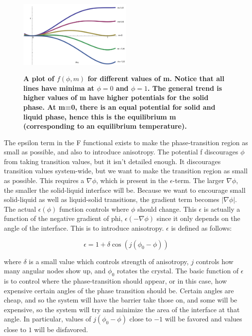 \documentclass[10pt]{article} %
\begin{document}
\begin{figure}[h!]
  \caption{\textbf{A plot of $f(\phi,m)$ for different values of m. Notice that all lines have minima at $\phi=0$ and $\phi=1$. The general trend is higher values of m have higher potentials for the solid phase. At m=0, there is an equal potential for solid and liquid phase, hence this is the equilibrium m (corresponding to an equilibrium temperature).}}
  \centering
  \includegraphics[width=0.5\textwidth]{../f_plot.png}
  \label{fig:f}
\end{figure}

The epsilon term in the F functional exists to make the phase-transition region as small as possible, and also to introduce anisotropy. The potential f discourages $\phi$ from taking transition values, but it isn't detailed enough. It discourages transition values system-wide, but we want to make the transition region as small as possible. This requires a $\nabla\phi$, which is present in the $\epsilon$-term. The larger $\nabla\phi$, the smaller the solid-liquid interface will be. Because we want to encourage small solid-liquid as well as liquid-solid transitions, the gradient term becomes $|\nabla\phi|$. The actual $\epsilon(\phi)$ function controls where $\phi$ should change. This $\epsilon$ is actually a function of the negative gradient of phi, $\epsilon(-\nabla\phi)$ since it only depends on the angle of the interface. This is to introduce anisotropy. $\epsilon$ is defined as follows:

\begin{equation}
  \epsilon = 1 + \delta\cos(j(\phi_0-\phi))
\end{equation}

where $\delta$ is a small value which controls strength of anisotropy, $j$ controls how many angular nodes show up, and $\phi_0$ rotates the crystal. The basic function of $\epsilon$ is to control where the phase-transition should appear, or in this case, how expensive certain angles of the phase transition should be. Certain angles are cheap, and so the system will have the barrier take those on, and some will be expensive, so the system will try and minimize the area of the interface at that angle. In particular, values of $j(\phi_0-\phi)$ close to $-1$ will be favored and values close to $1$ will be disfavored.\\
\end{document}
